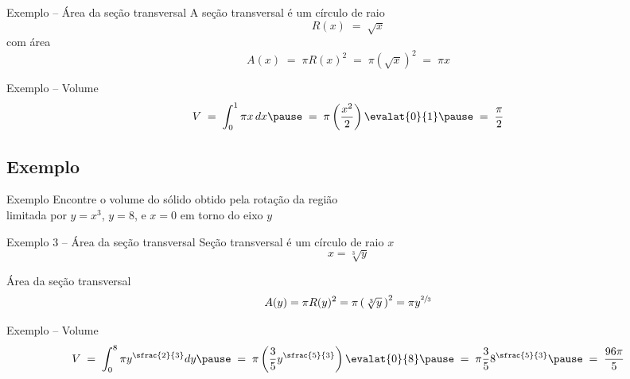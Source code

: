 
\begin{frame}{Exemplo \theexemplo{} -- Área da seção transversal}
  A seção transversal é um círculo de raio
  \[
    R(x)
    \;=\; \sqrt{x}
  \]
  \pause
  com área
  \[
    A(x)
    \;=\; \pi R(x)^2
    \;=\; \pi \left(\sqrt{x}\right)^2
    \;=\; \pi x
  \]
\end{frame}

\begin{frame}{Exemplo \theexemplo{} -- Volume}
  \[
    V
    \;=\; \int_0^1 \pi x \, dx
    \pause
    \;=\; \pi \left( \frac{x^2}{2}\right) \evalat{0}{1}
    \pause
    \;=\; \frac{\pi}{2}
  \]
\end{frame}

\addtocounter{exemplo}{1}
\subsection{Exemplo \theexemplo}

\begin{frame}{Exemplo \theexemplo{}}
  Encontre o volume do sólido obtido pela rotação da região \\
  limitada por $y = x^3$, $y = 8$, e $x = 0$ em torno do eixo $y$
\end{frame}


\begin{frame}{Exemplo 3 -- Área da seção transversal}
  Seção transversal é um círculo de raio $x$
  \[
    x = \sqrt[3]{y}
  \]

  \pause
  \vspace{\baselineskip}
  Área da seção transversal
  \[
    A(y)
    = \pi R(y)^2
    = \pi \left( \,\sqrt[3]{y}\, \right)^2
    = \pi y^{\sfrac{2}{3}}
  \]
\end{frame}

\begin{frame}{Exemplo \theexemplo{} -- Volume}
  \[
    V
    \;=\; \int_0^8 \pi y^{\sfrac{2}{3}}dy
    \pause
    \;=\; \pi \left( \frac{3}{5} y^{\sfrac{5}{3}}\right) \evalat{0}{8}
    \pause
    \;=\; \pi \frac{3}{5} 8^{\sfrac{5}{3}}
    \pause
    \;=\; \frac{96 \pi}{5}
  \]
\end{frame}

